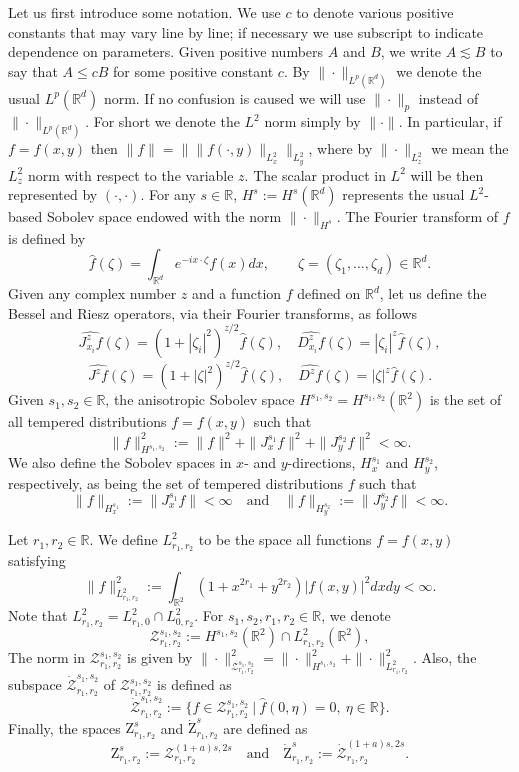 \documentclass[reqno]{amsart}
\newcommand{\R}{\mathbb R}
\numberwithin{equation}{section}
\begin{document}
Let us first introduce some notation. We use $c$ to denote various positive constants
that may vary line by line; if necessary we use subscript to indicate
dependence on parameters. Given positive numbers $A$ and $B$, we write $A\lesssim B$ to say that $A\leq cB$ for some positive constant $c$. By $\|\cdot\|_{L^p(\R^d)}$ we denote the usual $L^p(\R^d)$ norm. If no confusion is caused we will use $\|\cdot\|_{p}$ instead of $\|\cdot\|_{L^p(\R^d)}$.
For short we denote the $L^2$ norm simply by $\|\cdot\|$. In particular, if
$f=f(x,y)$ then $\|f\|=\|\|f(\cdot,y)\|_{L^2_x}\|_{L^2_y}$, where by
$\|\cdot\|_{L^2_z}$ we mean the $L^2_z$ norm with respect to the variable
$z$.  The scalar product
in $L^2$ will be then represented by $(\cdot,\cdot)$. For any $s\in \R$, $H^s:=H^s(\R^d)$ represents the usual $L^2$-based
Sobolev space endowed with the norm $\|\cdot\|_{H^s}$. The Fourier transform of $f$ is
defined by
$$
\hat{f}(\zeta)=\int_{\R^d}e^{-ix\cdot\zeta}f(x)dx, \qquad \zeta=(\zeta_1,\ldots,\zeta_d)\in\R^d.
$$
Given any complex number $z$ and a function $f$ defined on $\R^d$, let us define the Bessel and Riesz operators, via their Fourier transforms, as follows
$$
\widehat{J^z_{x_i}f}(\zeta)=(1+|\zeta_i|^2)^{z/2}\hat{f}(\zeta), \quad \widehat{D^z_{x_i}f}(\zeta)=|\zeta_i|^{z}\hat{f}(\zeta), 
$$
$$
\widehat{J^zf}(\zeta)=(1+|\zeta|^2)^{z/2}\hat{f}(\zeta), \quad \widehat{D^zf}(\zeta)=|\zeta|^{z}\hat{f}(\zeta).
$$
Given $s_1,s_2\in \R$, the anisotropic Sobolev space
$H^{s_1,s_2}=H^{s_1,s_2}(\R^2)$ is the set of all tempered distributions $f=f(x,y)$
such that
$$
\|f\|^{2}_{H^{s_1,s_2}}:=\|f\|^{2} +
\|J_x^{s_1}f\|^{2}+\|J_y^{s_2}f\|^{2}<\infty.
$$
We also define the Sobolev spaces in $x$- and $y$-directions, $H_x^{s_1}$ and $H_y^{s_2}$, respectively, as being the set of tempered distributions $f$ such
that
$$\|f\|_{H^{s_1}_x}:=\|J_x^{s_1}f\|<\infty \quad \mbox{and} \quad \|f\|_{H^{s_2}_y}:= \|J_y^{s_2}f\|<\infty.$$



Let $r_1,r_2\in \R$. We define $L^2_{r_1,r_2}$ to be the space all functions $f=f(x,y)$ satisfying
$$
\|f\|_{L^2_{r_1,r_2}}^2:= \int_{\R^2}(1+x^{2r_1}+y^{2r_2})|f(x,y)|^2 dxdy<\infty.
$$
Note that $L^2_{r_1,r_2}=L^2_{r_1,0}\cap L^2_{0,r_2}$.
For $s_1,s_2,r_1,r_2\in \R$, we denote
$$
\mathcal{Z}_{r_1,r_2}^{s_1,s_2}:=H^{s_1,s_2}(\R^2)\cap L^2_{r_1,r_2}(\R^2),
$$
 The norm in $\mathcal{Z}_{r_1,r_2}^{s_1,s_2}$ is
given by
$\|\cdot\|_{\mathcal{Z}_{r_1,r_2}^{s_1,s_2}}^2=\|\cdot\|_{H^{s_1,s_2}}^2+\|\cdot\|_{L^2_{r_1,r_2}}^2$.
Also, the subspace $\dot{\mathcal{Z}}_{r_1,r_2}^{s_1,s_2}$ of $\mathcal{Z}_{r_1,r_2}^{s_1,s_2}$ is defined as
$$
\dot{\mathcal{Z}}_{r_1,r_2}^{s_1,s_2}:=\{f\in\mathcal{Z}_{r_1,r_2}^{s_1,s_2}\ | \
\hat{f}(0,\eta)=0, \ \eta\in\R \}.
$$
Finally, the spaces $\mathrm{Z}^{s}_{r_1,r_2}$ and $\dot{\mathrm{Z}}^{s}_{r_1,r_2}$ are defined as
$$
\mathrm{Z}^{s}_{r_1,r_2}:= \mathcal{Z}_{r_{1},r_{2}}^{(1+a)s,2s} \quad \mbox{and} \quad \dot{\mathrm{Z}}^{s}_{r_1,r_2}:= \dot{\mathcal{Z}}_{r_{1},r_{2}}^{(1+a)s,2s}.
$$
\end{document}
